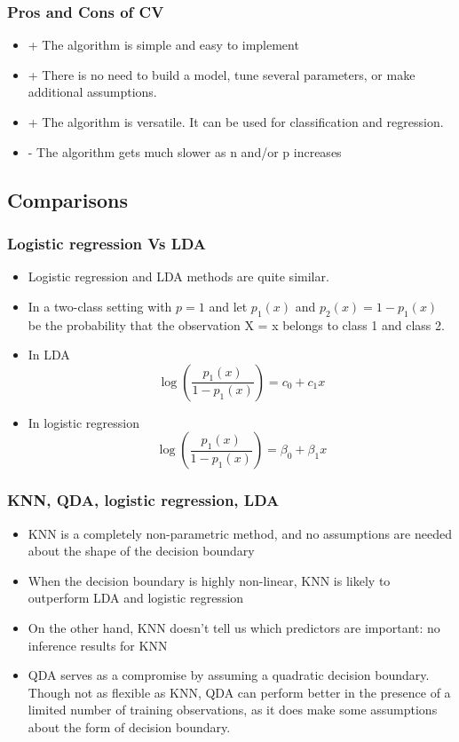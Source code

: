 \documentclass{article}
\begin{document}
\subsubsection{Pros and Cons of CV}
\begin{itemize}
    \item + The algorithm is simple and easy to implement
    \item + There is no need to build a model, tune several parameters, or make additional assumptions.
    \item + The algorithm is versatile. It can be used for classification and regression.
    \item - The algorithm gets much slower as n and/or p increases
\end{itemize}

\subsection{Comparisons}
\subsubsection{Logistic regression Vs LDA}
\begin{itemize}
    \item Logistic regression and LDA methods are quite similar. 
    \item In a two-class setting with $p = 1$ and let $p_1(x)$ and $p_2(x) = 1 - p_1(x)$ be the probability that the observation X = x belongs to class 1 and class 2.
    \item In LDA
    \begin{equation*}
        \log(\frac{p_1(x)}{1 - p_1(x)}) = c_0 + c_1 x
    \end{equation*}
    \item In logistic regression
    \begin{equation*}
        \log(\frac{p_1(x)}{1 - p_1(x)}) = \beta_0 + \beta_1 x
    \end{equation*}
\end{itemize}

\subsubsection{KNN, QDA, logistic regression, LDA}
\begin{itemize}
    \item KNN is a completely non-parametric method, and no assumptions are needed about the shape of the decision boundary
    \item When the decision boundary is highly non-linear, KNN is likely to outperform LDA and logistic regression
    \item On the other hand, KNN doesn't tell us which predictors are important: no inference results for KNN
    \item QDA serves as a compromise by assuming a quadratic decision boundary. Though not as flexible as KNN, QDA can perform better in the presence of a limited number of training observations, as it does make some assumptions about the form of decision boundary.
\end{itemize}
\end{document}
